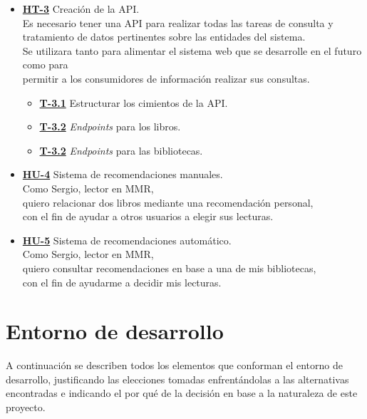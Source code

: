 \begin{itemize}
    \item \href{https://github.com/Anglepi/My-Many-Reads/issues/45}{\textbf{HT-3}} Creación de la API. \\
    Es necesario tener una API para realizar todas las tareas de consulta y tratamiento de datos pertinentes sobre las entidades del sistema. \\
    Se utilizara tanto para alimentar el sistema web que se desarrolle en el futuro como para \\
    permitir a los consumidores de información realizar sus consultas.
    \begin{itemize}
        \item \href{https://github.com/Anglepi/My-Many-Reads/issues/46}{\textbf{T-3.1}} Estructurar los cimientos de la API.
        \item \href{https://github.com/Anglepi/My-Many-Reads/issues/47}{\textbf{T-3.2}} \textit{Endpoints} para los libros.
        \item \href{https://github.com/Anglepi/My-Many-Reads/issues/48}{\textbf{T-3.2}} \textit{Endpoints} para las bibliotecas.
    \end{itemize}
    \item \href{https://github.com/Anglepi/My-Many-Reads/issues/49}{\textbf{HU-4}} Sistema de recomendaciones manuales. \\
    Como Sergio, lector en MMR, \\
    quiero relacionar dos libros mediante una recomendación personal, \\
    con el fin de ayudar a otros usuarios a elegir sus lecturas.
    \item \href{https://github.com/Anglepi/My-Many-Reads/issues/50}{\textbf{HU-5}} Sistema de recomendaciones automático. \\
    Como Sergio, lector en MMR, \\
    quiero consultar recomendaciones en base a una de mis bibliotecas, \\
    con el fin de ayudarme a decidir mis lecturas.
\end{itemize}

\section{Entorno de desarrollo}

A continuación se describen todos los elementos que conforman el entorno de desarrollo, justificando las elecciones tomadas enfrentándolas a las alternativas encontradas e indicando el por qué de la decisión en base a la naturaleza de este proyecto.

